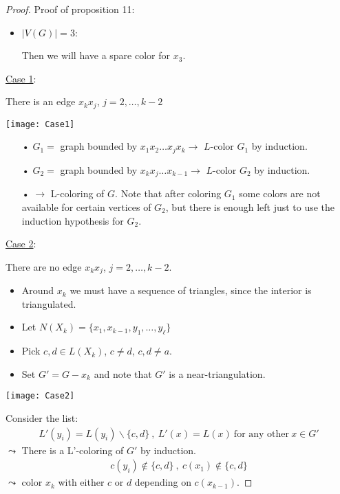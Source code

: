 \begin{proof}
Proof of proposition 11:

\begin{itemize}
\item $|V(G)|=3$: 
\begin{center}
\end{center}
Then we will have a spare color for $x_3$.
\end{itemize}

\underline{Case 1}:

There is an edge $x_k x_j$, $j=2,\ldots,k-2$
\begin{center}
\texttt{[image: Case1]}
\end{center}
\begin{itemize}
\item[•]$G_1=$ graph bounded by $x_1x_2\ldots x_jx_k \rightarrow$ $L$-color $G_1$ by induction.
\item[•] $G_2=$ graph bounded by $x_kx_j\ldots x_{k-1} \rightarrow $ $L$-color $G_2$ by induction.
\item[•] $\rightarrow$ L-coloring of $G$. Note that after coloring $G_1$ some colors are not available for certain vertices of $G_2$, but there is enough left just to use the induction hypothesis for $G_2$.
\end{itemize}

\underline{Case 2}:

There are no edge $x_k x_j$, $j=2,\ldots,k-2$.
\begin{itemize}
\item Around $x_k$ we must have a sequence of triangles, since the interior is triangulated.
\item Let $N(X_k)=\{x_1,x_{k-1},y_1,\ldots,y_{\ell}\}$
\item Pick $c,d \in L(X_k)$, $c\neq d$, $c,d \neq a$.
\item Set $G'=G-x_k$ and note that $G' $ is a near-triangulation. 
\end{itemize}
\begin{center}
\texttt{[image: Case2]}
\end{center}
Consider the list:
\begin{align*}
L'(y_i)=L(y_i)\backslash \{c,d\} \ , \ L'(x)=L(x) \ \text{for any other} \ x \in G'
\end{align*}
$\leadsto$ There is a L'-coloring of $G'$ by induction.
\begin{align*}
c(y_i)\notin \{c,d\} \ , \ c(x_1) \notin \{c,d\}
\end{align*}
$\leadsto$ color $x_k$ with either $c$ or $d$ depending on $c(x_{k-1})$.
\end{proof}

